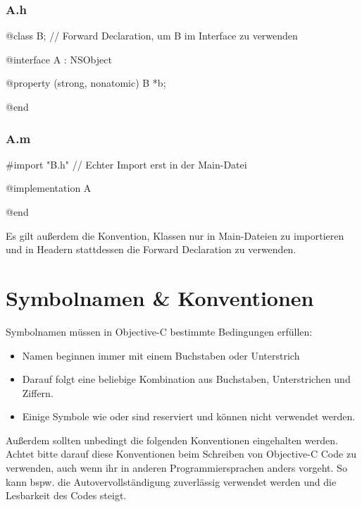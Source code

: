 \documentclass[parskip=half, final]{scrreprt}
\begin{document}
\subsubsection{A.h}
\begin{objclst}
@class B; // Forward Declaration, um B im Interface zu verwenden

@interface A : NSObject

@property (strong, nonatomic) B *b;

@end
\end{objclst}
\subsubsection{A.m}
\begin{objclst}
#import "B.h" // Echter Import erst in der Main-Datei

@implementation A

@end
\end{objclst}

Es gilt außerdem die Konvention, Klassen nur in Main-Dateien zu importieren und in Headern stattdessen die Forward Declaration zu verwenden.

\section{Symbolnamen \& Konventionen}\label{sec:konventionen}

Symbolnamen müssen in Objective-C bestimmte Bedingungen erfüllen:

\begin{itemize}
\item Namen beginnen immer mit einem Buchstaben oder Unterstrich \objc{_}
\item Darauf folgt eine beliebige Kombination aus Buchstaben, Unterstrichen und Ziffern.
\item Einige Symbole wie  oder  sind reserviert und können nicht verwendet werden.
\end{itemize}

Außerdem sollten unbedingt die folgenden Konventionen eingehalten werden. Achtet bitte darauf diese Konventionen beim Schreiben von Objective-C Code zu verwenden, auch wenn ihr in anderen Programmiersprachen anders vorgeht. So kann bspw. die Autovervollständigung zuverlässig verwendet werden und die Lesbarkeit des Codes steigt.
\end{document}
